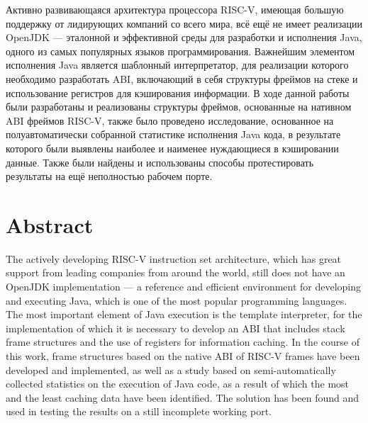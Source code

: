 \documentclass[14pt]{spbau-diploma}
\begin{document}
Активно развивающаяся архитектура процессора RISC-V, имеющая большую поддержку от лидирующих компаний со всего мира, всё ещё не имеет реализации OpenJDK --- эталонной и эффективной среды для разработки и исполнения Java, одного из самых популярных языков программирования. Важнейшим элементом исполнения Java является шаблонный интерпретатор, для реализации которого необходимо разработать ABI, включающий в себя структуры фреймов на стеке и использование регистров для кэширования информации. В ходе данной работы были разработаны и реализованы структуры фреймов, основанные на нативном ABI фреймов RISC-V, также было проведено исследование, основанное на полуавтоматически собранной статистике исполнения Java кода, в результате которого были выявлены наиболее и наименее нуждающиеся в кэшировании данные. Также были найдены и использованы способы протестировать результаты на ещё неполностью рабочем порте.

\section*{Abstract}

The actively developing RISC-V instruction set architecture, which has great support from leading companies from around the world, still does not have an OpenJDK implementation --- a reference and efficient environment for developing and executing Java, which is one of the most popular programming languages. The most important element of Java execution is the template interpreter, for the implementation of which it is necessary to develop an ABI that includes stack frame structures and the use of registers for information caching. In the course of this work, frame structures based on the native ABI of RISC-V frames have been developed and implemented, as well as a study based on semi-automatically collected statistics on the execution of Java code, as a result of which the most and the least caching data have been identified. The solution has been found and used in testing the results on a still incomplete working port.
















\glsaddall
\printnoidxglossary[title=Глоссарий, toctitle=Глоссарий, style=altlist,nonumberlist]



\end{document}
